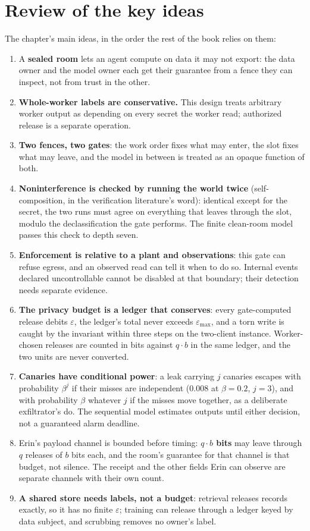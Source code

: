 \documentclass[11pt,a4paper]{article}
\theoremstyle{definition}
\begin{document}
\section*{Review of the key ideas}
The chapter's main ideas, in the order the rest of the book relies on them:

\begin{enumerate}[leftmargin=1.6em,itemsep=2pt]
\item A \textbf{sealed room} lets an agent compute on data it may not export: the data owner and the model owner each get their guarantee from a fence they can inspect, not from trust in the other.
\item \textbf{Whole-worker labels are conservative.} This design treats arbitrary worker output as depending on every secret the worker read; authorized release is a separate operation.
\item \textbf{Two fences, two gates}: the work order fixes what may enter, the slot fixes what may leave, and the model in between is treated as an opaque function of both.
\item \textbf{Noninterference is checked by running the world twice} (self-composition, in the verification literature's word): identical except for the secret, the two runs must agree on everything that leaves through the slot, modulo the declassification the gate performs. The finite clean-room model passes this check to depth seven.
\item \textbf{Enforcement is relative to a plant and observations}: this gate can refuse egress, and an observed read can tell it when to do so. Internal events declared uncontrollable cannot be disabled at that boundary; their detection needs separate evidence.
\item \textbf{The privacy budget is a ledger that conserves}: every gate-computed release debits $\varepsilon$, the ledger's total never exceeds $\varepsilon_{\max}$, and a torn write is caught by the invariant within three steps on the two-client instance. Worker-chosen releases are counted in bits against $q\cdot b$ in the same ledger, and the two units are never converted.
\item \textbf{Canaries have conditional power}: a leak carrying $j$ canaries escapes with probability $\beta^{j}$ if their misses are independent ($0.008$ at $\beta=0.2$, $j=3$), and with probability $\beta$ whatever $j$ if the misses move together, as a deliberate exfiltrator's do. The sequential model estimates outputs until either decision, not a guaranteed alarm deadline.
\item Erin's payload channel is bounded before timing: \textbf{$q \cdot b$ bits} may leave through $q$ releases of $b$ bits each, and the room's guarantee for that channel is that budget, not silence. The receipt and the other fields Erin can observe are separate channels with their own count.
\item \textbf{A shared store needs labels, not a budget}: retrieval releases records exactly, so it has no finite $\varepsilon$; training can release through a ledger keyed by data subject, and scrubbing removes no owner's label.
\end{enumerate}
\end{document}
